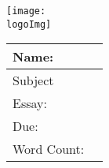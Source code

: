 \begin{center}
	\texttt{[image: \\logoImg]}
	
	\vspace{.5cm}
	\def\arraystretch{1.3}
	\begin{tabular}{ m{} | m{} }
		\toprule
		Name: & \myName  \\
		\midrule
		Subject & \mySubject \\
		\midrule
		Essay: & \essayTitle \\
		\midrule
		Due: & \dueDate \\
		\midrule
		Word Count: &  \wordCount \\ 	
		\bottomrule
	\end{tabular}
	\vspace{.5cm}
\end{center}

